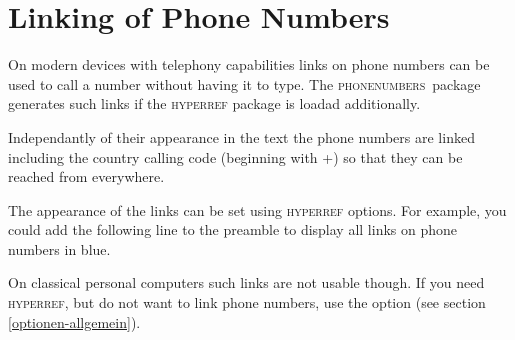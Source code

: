 \documentclass[numbers=noenddot]{scrreprt}
\newcommand*{\Paket}[1]{\textsc{#1}}
\newcommand{\phone}{\textcolor{cnltx}{\Paket{phone\-numbers}}}
\newcommand*{\sieheAbschnitt}[1]{(see section \ref{#1})}
\begin{document}
\section{Linking of Phone Numbers} \label{verlinkung}
On modern devices with telephony capabilities links on phone numbers can be used to call a number without having it to type. The \phone\ package generates such links if the \Paket{hyperref} package
\cite{hyperref}
is loadad additionally.

Independantly of their appearance in the text the phone numbers are linked including the country calling code (beginning with +) so that they can be reached from everywhere.

The appearance of the links can be set using \Paket{hyperref} options. For example, you could add the following line to the preamble to display all links on phone numbers in blue.

\begin{sourcecode}
  \usepackage[colorlinks=true,urlcolor=blue]{hyperref}
\end{sourcecode}

On classical personal computers such links are not usable though. If you need \Paket{hyperref}, but do not want to link phone numbers, use the  option
\sieheAbschnitt{optionen-allgemein}.
\end{document}
